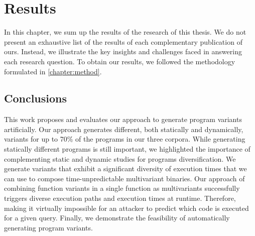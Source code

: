 \chapter{Results} 

In this chapter, we sum up the results of the research of this thesis. We do not present an exhaustive list of the results of each complementary publication of ours. Instead, we illustrate the key insights and challenges faced in answering each research question.  To obtain our results, we followed the methodology formulated in \autoref{chapter:method}.







\pagebreak
\section{Conclusions}

This work proposes and evaluates our approach to generate \wasm program variants artificially. Our approach generates different, both statically and dynamically, variants for up to 70\% of the programs in our three corpora. While generating statically different programs is still important, we highlighted the importance of complementing static and dynamic studies for programs diversification. We generate variants that exhibit a significant diversity of execution times that we can use to compose time-unpredictable multivariant binaries. Our approach of combining function variants in a single function as multivariants successfully triggers diverse execution paths and execution times at runtime. Therefore, making it virtually impossible for an attacker to predict which code is executed for a given query. Finally, we demonstrate the feasibility of automatically generating \wasm program variants.

